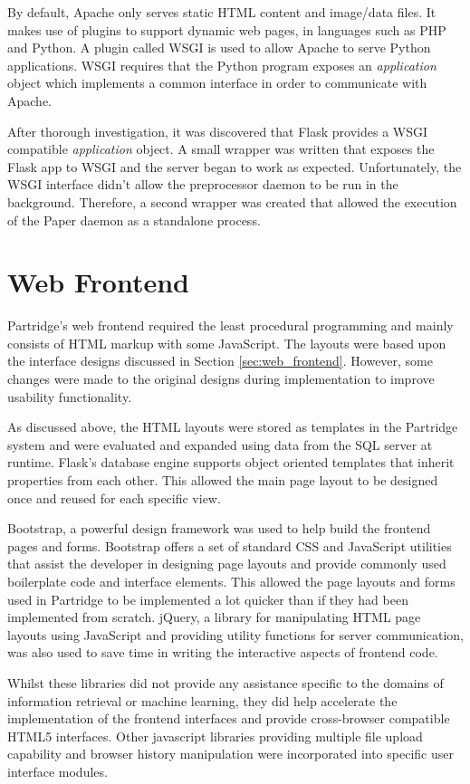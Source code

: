 By default, Apache only serves static HTML content and image/data files. It makes
use of plugins to support dynamic web pages, in languages such as PHP and
Python. A plugin called WSGI is used to allow Apache to serve Python
applications. WSGI requires that the Python program exposes an
\emph{application} object which implements a common interface in order to
communicate with Apache.

After thorough investigation, it was discovered that Flask provides a WSGI
compatible \emph{application} object. A small wrapper was written that exposes
the Flask app to WSGI and the server began to work as expected. Unfortunately,
the WSGI interface didn't allow the preprocessor daemon to be run in the
background. Therefore, a second wrapper was created that allowed the execution
of the Paper daemon as a standalone process.

\section{Web Frontend}

Partridge's web frontend required the least procedural programming and mainly
consists of HTML markup with some JavaScript. The layouts were based upon the
interface designs discussed in Section \ref{sec:web_frontend}. However, some
changes were made to the original designs during implementation to improve
usability functionality.

As discussed above, the HTML layouts were stored as templates in the
Partridge system and were evaluated and expanded using data from the SQL
server at runtime. Flask's database engine supports object oriented templates
that inherit properties from each other. This allowed the main page layout to
be designed once and reused for each specific view. 

Bootstrap, a powerful design framework was used to help build the frontend
pages and forms. Bootstrap offers a set of standard CSS and JavaScript
utilities that assist the developer in designing page layouts and provide
commonly used boilerplate code and interface elements\cite{bootstrap2013}. This
allowed the page layouts and forms used in Partridge to be implemented a lot
quicker than if they had been implemented from scratch. jQuery, a library for
manipulating HTML page layouts using JavaScript and providing utility functions
for server communication, was also used to save time in writing the interactive
aspects of frontend code. 

Whilst these libraries did not provide any assistance specific to the domains
of information retrieval or machine learning, they did help accelerate the
implementation of the frontend interfaces and provide cross-browser compatible HTML5
interfaces. Other javascript libraries providing multiple file upload
capability and browser history manipulation were incorporated into specific
user interface modules.

